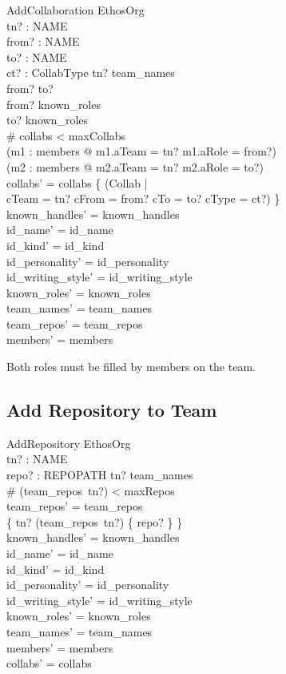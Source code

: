 \documentclass[a4paper,10pt,fleqn]{article}
\begin{document}
\begin{schema}{AddCollaboration}
  \Delta EthosOrg \\
  tn? : NAME \\
  from? : NAME \\
  to? : NAME \\
  ct? : CollabType
\where
  tn? \in team\_names \\
  from? \neq to? \\
  from? \in known\_roles \\
  to? \in known\_roles \\
  \# collabs < maxCollabs \\
  (\exists m1 : members @ m1.aTeam = tn? \land m1.aRole = from?) \\
  (\exists m2 : members @ m2.aTeam = tn? \land m2.aRole = to?) \\
  collabs' = collabs \cup \{ (\mu Collab | \\
  \quad cTeam = tn? \land cFrom = from? \land cTo = to? \land cType = ct?) \} \\
  known\_handles' = known\_handles \\
  id\_name' = id\_name \\
  id\_kind' = id\_kind \\
  id\_personality' = id\_personality \\
  id\_writing\_style' = id\_writing\_style \\
  known\_roles' = known\_roles \\
  team\_names' = team\_names \\
  team\_repos' = team\_repos \\
  members' = members
\end{schema}

Both roles must be filled by members on the team.

\subsection{Add Repository to Team}

\begin{schema}{AddRepository}
  \Delta EthosOrg \\
  tn? : NAME \\
  repo? : REPOPATH
\where
  tn? \in team\_names \\
  \# (team\_repos~tn?) < maxRepos \\
  team\_repos' = team\_repos \oplus \\
  \quad \{ tn? \mapsto (team\_repos~tn?) \cup \{ repo? \} \} \\
  known\_handles' = known\_handles \\
  id\_name' = id\_name \\
  id\_kind' = id\_kind \\
  id\_personality' = id\_personality \\
  id\_writing\_style' = id\_writing\_style \\
  known\_roles' = known\_roles \\
  team\_names' = team\_names \\
  members' = members \\
  collabs' = collabs
\end{schema}
\end{document}

